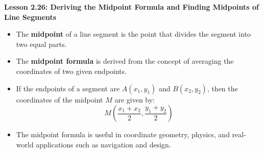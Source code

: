 \begin{center}
\textbf{Lesson 2.26: Deriving the Midpoint Formula and Finding Midpoints of Line Segments}
\end{center}

\vspace*{-1.5ex}

\begin{itemize}
    \item The \textbf{midpoint} of a line segment is the point that divides the segment into two equal parts.
    \item The \textbf{midpoint formula} is derived from the concept of averaging the coordinates of two given endpoints.
    \item If the endpoints of a segment are $A(x_1, y_1)$ and $B(x_2, y_2)$, then the coordinates of the midpoint $M$ are given by:
    \[
    M \left( \dfrac{x_1 + x_2}{2}, \dfrac{y_1 + y_2}{2} \right)
    \]
    \item The midpoint formula is useful in coordinate geometry, physics, and real-world applications such as navigation and design.
\end{itemize}
